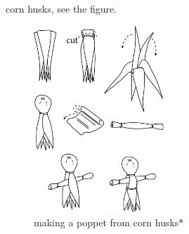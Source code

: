 \documentclass[twoside,11pt,b5paper,twocolumn]{scrbook}
\begin{document}
corn husks, see the figure.\begin{figure}\centering\includegraphics[width=5cm]{encyclopedia/poppet}\caption{making a poppet from corn husks*}\end{figure}
\end{document}

